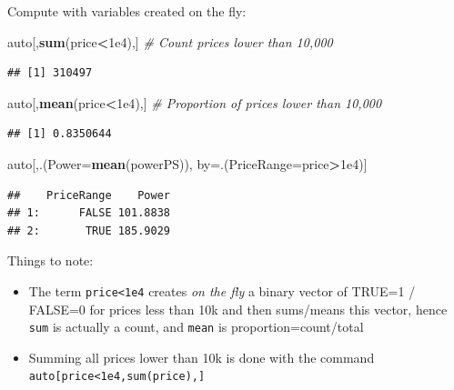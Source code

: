\documentclass[]{book}
\newenvironment{Shaded}{\begin{snugshade}}{\end{snugshade}}
\newcommand{\CommentTok}[1]{\textcolor[rgb]{0.56,0.35,0.01}{\textit{#1}}}
\newcommand{\DataTypeTok}[1]{\textcolor[rgb]{0.13,0.29,0.53}{#1}}
\newcommand{\FloatTok}[1]{\textcolor[rgb]{0.00,0.00,0.81}{#1}}
\newcommand{\KeywordTok}[1]{\textcolor[rgb]{0.13,0.29,0.53}{\textbf{#1}}}
\newcommand{\NormalTok}[1]{#1}
\newcommand{\OperatorTok}[1]{\textcolor[rgb]{0.81,0.36,0.00}{\textbf{#1}}}
\providecommand{\tightlist}{%
  \setlength{\itemsep}{0pt}\setlength{\parskip}{0pt}}
\theoremstyle{definition}
\theoremstyle{definition}
\theoremstyle{definition}
\theoremstyle{remark}
\begin{document}
Compute with variables created on the fly:

\begin{Shaded}
\begin{Highlighting}[]
\NormalTok{auto[,}\KeywordTok{sum}\NormalTok{(price}\OperatorTok{<}\FloatTok{1e4}\NormalTok{),] }\CommentTok{# Count prices lower than 10,000}
\end{Highlighting}
\end{Shaded}

\begin{verbatim}
## [1] 310497
\end{verbatim}

\begin{Shaded}
\begin{Highlighting}[]
\NormalTok{auto[,}\KeywordTok{mean}\NormalTok{(price}\OperatorTok{<}\FloatTok{1e4}\NormalTok{),] }\CommentTok{# Proportion of prices lower than 10,000}
\end{Highlighting}
\end{Shaded}

\begin{verbatim}
## [1] 0.8350644
\end{verbatim}

\begin{Shaded}
\begin{Highlighting}[]
\NormalTok{auto[,.(}\DataTypeTok{Power=}\KeywordTok{mean}\NormalTok{(powerPS)), by=.(}\DataTypeTok{PriceRange=}\NormalTok{price}\OperatorTok{>}\FloatTok{1e4}\NormalTok{)] }
\end{Highlighting}
\end{Shaded}

\begin{verbatim}
##    PriceRange    Power
## 1:      FALSE 101.8838
## 2:       TRUE 185.9029
\end{verbatim}

Things to note:

\begin{itemize}
\tightlist
\item
  The term \texttt{price\textless{}1e4} creates \emph{on the fly} a binary vector of TRUE=1 / FALSE=0 for prices less than 10k and then sums/means this vector, hence \texttt{sum} is actually a count, and \texttt{mean} is proportion=count/total
\item
  Summing all prices lower than 10k is done with the command \texttt{auto{[}price\textless{}1e4,sum(price),{]}}
\end{itemize}
\end{document}
